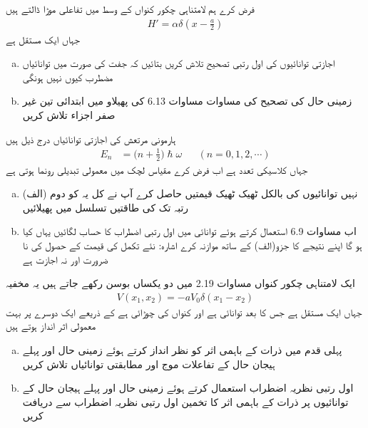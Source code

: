 فرض کرے ہم لامتناہی چکور کنواں کے وسط میں  تفاعلی موڑا ڈالتے ہیں 
\begin{align*}
H' = \alpha \delta (x - \frac{a}{2})
\end{align*}
جہاں  ایک مستقل ہے 
\begin{enumerate}[a.]
\item
 اجازتی توانائیوں کی اول رتبی تصحیح تلاش کریں بتائیں کہ جفت  کی صورت میں توانائیاں مضطرب کیوں نہیں ہونگی   
\item
 زمینی حال کی  تصحیح  کی مساوات مساوات 6.13 کی پھیلاو  میں ابتدائی تین غیر صفر اجزاء تلاش کریں  
 \end{enumerate}

ہارمونی مرتعش  
کی اجازتی توانائیاں درج ذیل ہیں 
\begin{align*}
E_n &= \big(n + \frac{1}{2}\big) \hslash \omega  && (n = 0, 1, 2, \cdots )
\end{align*}
جہاں  کلاسیکی تعدد ہے اب فرض کرے مقیاس لچک میں معمولی تبدیلی رونما ہوتی ہے 
\begin{enumerate}[a.]
\item
(الف) نہیں توانائیوں کی بالکل ٹھیک ٹھیک قیمتیں  حاصل  کرے آپ نے کل یہ کو دوم رتبہ تک  کی طاقتیں تسلسل میں پھیلائیں 
\item
 اب مساوات 6.9 استعمال کرتے ہوئے توانائی میں اول رتبی اضطراب کا حساب لگائیں یہاں  کیا  ہو گا اپنے نتیجے کا جزو(الف) کے ساتھ موازنہ کرے اشارہ: نئے تکمل کی قیمت کے حصول کی نا ضرورت اور نہ اجازت ہے 
 \end{enumerate}
ایک لامتناہی چکور کنواں مساوات 2.19 میں دو یکساں بوسن رکھے جاتے ہیں یہ مخفیہ 
\begin{align*}
V(x_1, x_2) = -aV_0\delta (x_1 - x_2)
\end{align*}
 جہاں  ایک مستقل ہے جس کا بعد توانائی ہے  اور  کنواں کی چوڑائی ہے کے ذریعے ایک دوسرے پر بہت معمولی اثر انداز ہوتے ہیں 
\begin{enumerate}[a.]
\item
 پہلی قدم میں ذرات کے باہمی   اثر  کو نظر انداز کرتے ہوئے زمینی حال اور پہلے ہیجان حال کے تفاعلات موج اور مطابقتی توانائیاں تلاش کریں 
\item
 اول رتبی نظریہ اضطراب استعمال کرتے ہوئے زمینی حال اور پہلے    ہیجان  حال کے توانائیوں پر ذرات کے باہمی  اثر کا تخمین اول رتبی نظریہ اضطراب سے دریافت کریں 
 \end{enumerate}

